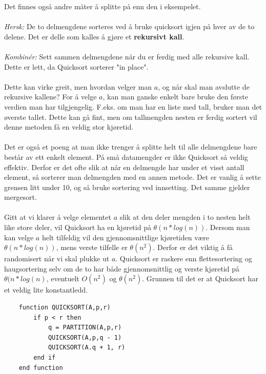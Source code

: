 \noindent Det finnes også andre måter å splitte på enn den i eksempelet.
\\\\
\textit{Hersk:} De to delmengdene sorteres ved å bruke quicksort igjen på hver av de to delene. Det er delle som kalles å gjøre et \textbf{rekursivt kall}.
\\\\
\textit{Kombinér:} Sett sammen delmengdene når du er ferdig med alle rekursive kall. Dette er lett, da Quicksort sorterer "in place".
\\\\
Dette kan virke greit, men hvordan velger man $a$, og når skal man avslutte de rekursive kallene? For å velge $a$, kan man ganske enkelt bare bruke den første verdien man har tilgjengelig. F.eks. om man har en liste med tall, bruker man det øverste tallet. Dette kan gå fint, men om tallmengden nesten er ferdig sortert vil denne metoden få en veldig stor kjøretid.
\\\\
Det er også et poeng at man ikke trenger å splitte helt til alle delmengdene bare består av ett enkelt element. På små datamengder er ikke Quicksort så veldig effektiv. Derfor er det ofte slik at når en delmengde har under et visst antall element, så sorterer man delmengden med en annen metode. Det er vanlig å sette grensen litt under 10, og så bruke sortering ved innsetting. Det samme gjelder mergesort.
\\\\
Gitt at vi klarer å velge elementet $a$ slik at den deler mengden i to nesten helt like store deler, vil Quicksort ha en kjøretid på \textbf{$\theta(n * log(n))$}. Dersom man kan velge $a$ helt tilfeldig vil den gjennomsnittlige kjøretiden være \textbf{$\theta(n * log(n))$}, mens verste tilfelle er $\theta(n^2)$. Derfor er det viktig å få randomisert når vi skal plukke ut $a$. Quicksort er raskere enn flettesortering og haugsortering selv om de to har både gjennomsnittlig og verste kjøretid på $\theta(n * log(n)$, eventuelt $O(n^2)$ og $\theta (n^2)$. Grunnen til det er at Quicksort har et veldig lite konstantledd.

\begin{lstlisting}
    function QUICKSORT(A,p,r)
    	if p < r then
    		q = PARTITION(A,p,r)
    		QUICKSORT(A,p,q - 1)
    		QUICKSORT(A.q + 1, r)
    	end if
    end function
\end{lstlisting}


